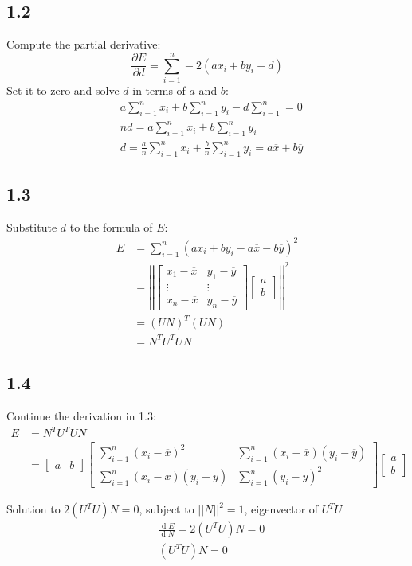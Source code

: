 \documentclass{article}
\newcommand*{\dif}{\mathop{\mathrm{d}}\!} %
\begin{document}
\subsection*{1.2}
Compute the partial derivative:
\begin{equation}
\frac{\partial E}{\partial d}=\sum^n_{i=1}-2(ax_i+by_i-d)
\end{equation}
Set it to zero and solve $d$ in terms of $a$ and $b$:
\begin{equation}
\begin{aligned}
&a\sum^n_{i=1}x_i+b\sum^n_{i=1}y_i-d\sum^n_{i=1}=0\\
&nd=a\sum^n_{i=1}x_i+b\sum^n_{i=1}y_i\\
&d=\frac{a}{n}\sum^n_{i=1}x_i+\frac{b}{n}\sum^n_{i=1}y_i=a\overline{x}+b\overline{y}
\end{aligned}
\end{equation}

\subsection*{1.3}
Substitute $d$ to the formula of $E$:
\begin{equation}
\begin{aligned}
E&=\sum^n_{i=1}(ax_i+by_i-a\overline{x}-b\overline{y})^2\\
&=\left|\left|\begin{bmatrix}x_1-\overline{x}&y_1-\overline{y}\\ \vdots&\vdots\\ x_n-\overline{x}&y_n-\overline{y}\end{bmatrix}
\begin{bmatrix}a\\b\end{bmatrix}\right|\right|^2\\
&=(UN)^T(UN)\\
&=N^TU^TUN
\end{aligned}
\end{equation}

\subsection*{1.4}
Continue the derivation in 1.3:
\begin{equation}
\begin{aligned}
E&=N^TU^TUN\\
&=\begin{bmatrix}a&b\end{bmatrix}\begin{bmatrix}\sum^n_{i=1}(x_i-\overline{x})^2&\sum^n_{i=1}(x_i-\overline{x})(y_i-\overline{y})\\ \sum^n_{i=1}(x_i-\overline{x})(y_i-\overline{y})&\sum^n_{i=1}(y_i-\overline{y})^2\end{bmatrix}\begin{bmatrix}a\\b\end{bmatrix}
\end{aligned}
\end{equation}

Solution to $2(U^TU)N=0$, subject to $||N||^2=1$, eigenvector of $U^TU$
\begin{equation}
\begin{aligned}
&\frac{\dif E}{\dif N}=2(U^TU)N=0\\
&(U^TU)N=0
\end{aligned}
\end{equation}
\end{document}
